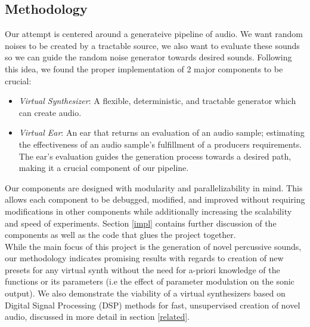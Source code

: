 \documentclass{nime-alternate} %
\begin{document}
\subsection{Methodology}
Our attempt is centered around a generateive pipeline of audio. We want random noises to be created by a tractable source, we also want to evaluate these sounds so we can guide the random noise generator towards desired sounds. Following this idea, we found the proper implementation of 2 major components to be crucial:
\begin{itemize}
    \item \textit{Virtual Synthesizer}: A flexible, deterministic, and tractable generator which can create audio. 
    \item \textit{Virtual Ear}: An ear that returns an evaluation of an audio sample; estimating the effectiveness of an audio sample's fulfillment of a producers requirements. The ear's evaluation guides the generation process towards a desired path, making it a crucial component of our pipeline. 
\end{itemize}
Our components are designed with modularity and parallelizability in mind. This allows each component to be debugged, modified, and improved without requiring modifications in other components while additionally increasing the scalability and speed of experiments. 
Section \ref{impl} contains further discussion of the components as well as the code that glues the project together.\\ 
While the main focus of this project is the generation of novel percussive sounds, our methodology indicates promising results with regards to creation of new presets for any virtual synth without the need for a-priori knowledge of the functions or its parameters (i.e the effect of parameter modulation on the sonic output). We also demonstrate the viability of a virtual synthesizers based on Digital Signal Processing (DSP) methods for fast, unsupervised creation of novel audio, discussed in more detail in section \ref{related}. \\
\end{document}
